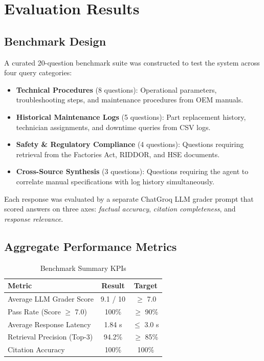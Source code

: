 \documentclass[12pt,a4paper]{article}
\begin{document}
\section{Evaluation Results}

\subsection{Benchmark Design}

A curated 20-question benchmark suite was constructed to test the system across four query categories:

\begin{itemize}[leftmargin=1.5em]
  \item \textbf{Technical Procedures} (8 questions): Operational parameters, troubleshooting steps, and maintenance procedures from OEM manuals.
  \item \textbf{Historical Maintenance Logs} (5 questions): Part replacement history, technician assignments, and downtime queries from CSV logs.
  \item \textbf{Safety \& Regulatory Compliance} (4 questions): Questions requiring retrieval from the Factories Act, RIDDOR, and HSE documents.
  \item \textbf{Cross-Source Synthesis} (3 questions): Questions requiring the agent to correlate manual specifications with log history simultaneously.
\end{itemize}

Each response was evaluated by a separate ChatGroq LLM grader prompt that scored answers on three axes: \emph{factual accuracy}, \emph{citation completeness}, and \emph{response relevance}.

\subsection{Aggregate Performance Metrics}

\begin{table}[htbp]
\centering
\caption{Benchmark Summary KPIs}
\begin{tabular}{lcc}
\toprule
\textbf{Metric} & \textbf{Result} & \textbf{Target} \\
\midrule
Average LLM Grader Score     & 9.1 / 10    & $\geq$ 7.0 \\
Pass Rate (Score $\geq$ 7.0) & 100\%       & $\geq$ 90\% \\
Average Response Latency     & 1.84 s      & $\leq$ 3.0 s \\
Retrieval Precision (Top-3)  & 94.2\%      & $\geq$ 85\% \\
Citation Accuracy            & 100\%       & 100\% \\
\bottomrule
\end{tabular}
\end{table}
\end{document}
